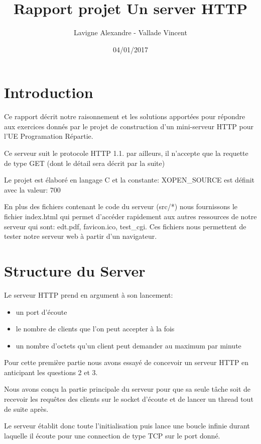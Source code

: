 \documentclass{article}
\title{Rapport projet Un server HTTP}
\author{Lavigne Alexandre - Vallade Vincent}
\date{04/01/2017}
\begin{document}
\maketitle

\section*{Introduction}

Ce rapport décrit notre raisonnement et les solutions apportées pour répondre aux exercices donnés
par le projet de construction d'un mini-serveur HTTP pour l'UE Programation Répartie.\hbox{}

Ce serveur suit le protocole HTTP 1.1. par ailleurs, il n'accepte que la requette de type GET (dont le détail sera décrit par la suite)\hbox{}

Le projet est élaboré en langage C et la constante: XOPEN\_SOURCE est définit avec la valeur: 700\hbox{}

En plus des fichiers contenant le code du serveur (src/*) nous fournissons le fichier index.html qui permet d'accéder rapidement aux autres
ressources de notre serveur qui sont: edt.pdf, favicon.ico, test\_cgi. Ces fichiers nous permettent de tester notre serveur web à partir d'un navigateur.

\section{Structure du Server}

Le serveur HTTP prend en argument à son lancement:
\begin{itemize}
\item un port d'écoute
\item le nombre de clients que l'on peut accepter à la fois
\item un nombre d'octets qu'un client peut demander au maximum par minute
\end{itemize}

Pour cette première partie nous avons essayé de concevoir un serveur HTTP en anticipant les questions 2 et 3.\hbox{}

Nous avons conçu la partie principale du serveur pour que sa seule tâche soit de recevoir les requêtes des clients sur le socket d'écoute et de lancer un thread tout de suite après.\hbox{}

Le serveur établit donc toute l'initialisation puis lance une boucle infinie durant laquelle il écoute pour une connection de type TCP sur le port donné.
\hbox{}
\end{document}
